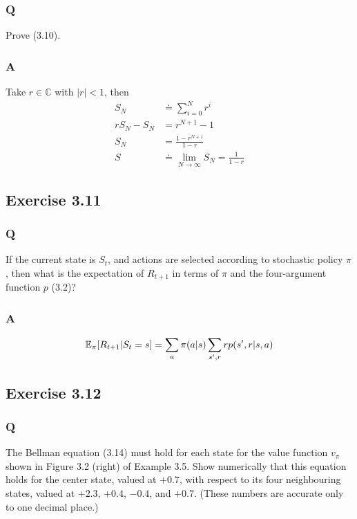 \subsubsection{Q}
Prove (3.10).

\subsubsection{A}
Take $r \in \mathbb{C}$ with $|r| < 1$, then
\begin{align*}
    S_N &\doteq \sum_{i=0}^N r^i \\
    rS_N - S_N &= r^{N+1} - 1 \\
    S_N &= \frac{1 - r^{N+1}}{1 - r} \\
    S &\doteq \lim_{N \to \infty} S_N = \frac{1}{1 - r}
\end{align*}

\subsection{Exercise 3.11}
\subsubsection{Q}
If the current state is $S_t$, and actions are selected according to stochastic policy $\pi$, then what is the expectation of $R_{t+1}$ in terms of $\pi$ and the four-argument function $p$ (3.2)?

\subsubsection{A}
\begin{equation}
    \mathbb{E}_\pi{} [R_{t+1} | S_t = s] = \sum_{a} \pi(a | s) \sum_{s', r} r p(s', r | s, a)
\end{equation}


\subsection{Exercise 3.12}
\subsubsection{Q}
The Bellman equation (3.14) must hold for each state for the value function $v_\pi$ shown in Figure 3.2 (right) of Example 3.5. Show numerically that this equation holds for the center state, valued at $+0.7$, with respect to its four neighbouring states, valued at $+2.3$, $+0.4$, $-0.4$, and $+0.7$. (These numbers are accurate only to one decimal place.)

